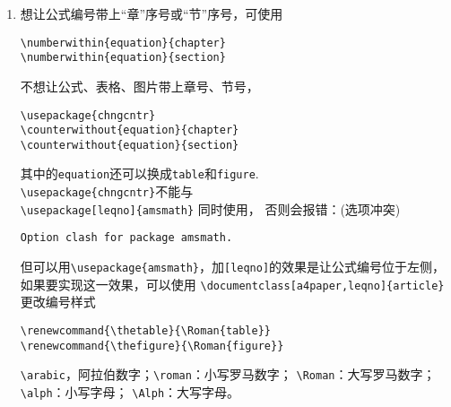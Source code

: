 \documentclass[fontset=windows]{article}
\begin{document}
\begin{multicols}{2}
\begin{enumerate}
\begin{lstlisting}
\end{center}
\end{lstlisting} 
以上给公式外围加边框用的是：
\begin{lstlisting}
\begin{align*}
    \boxed{
        \begin{aligned}
            ······
        \end{aligned} 
    }
\end{align*}
\end{lstlisting}
或
\begin{lstlisting}
\usepackage{tcolorbox}
\tcbset{before={\noindent},
    after={\noindent},colback=white}
\begin{tcolorbox}
    \vspace{-5mm}
    \begin{align*}
        ······
    \end{align*} 
\end{tcolorbox}
\end{lstlisting} 

\item 想让公式编号带上“章”序号或“节”序号，可使用
\begin{lstlisting}
\numberwithin{equation}{chapter}
\numberwithin{equation}{section}    
\end{lstlisting} 
不想让公式、表格、图片带上章号、节号，
\begin{lstlisting}
\usepackage{chngcntr}
\counterwithout{equation}{chapter}
\counterwithout{equation}{section}  
\end{lstlisting} 
其中的\verb|equation|还可以换成\verb|table|和\verb|figure|.\\
\verb|\usepackage{chngcntr}|不能与 \\
\verb|\usepackage[leqno]{amsmath}| 同时使用，
否则会报错：(选项冲突) 
\begin{lstlisting}
Option clash for package amsmath.    
\end{lstlisting} 
但可以用\verb|\usepackage{amsmath}|，加\verb|[leqno]|的效果是让公式编号位于左侧，
如果要实现这一效果，可以使用
\verb|\documentclass[a4paper,leqno]{article}| \\
更改编号样式
\begin{lstlisting}
\renewcommand{\thetable}{\Roman{table}}
\renewcommand{\thefigure}{\Roman{figure}}    
\end{lstlisting} 
\verb|\arabic|，阿拉伯数字；\verb|\roman|：小写罗马数字；
\verb|\Roman|：大写罗马数字；\verb|\alph|：小写字母；
\verb|\Alph|：大写字母。


\end{enumerate}
\end{multicols}
\end{document}
